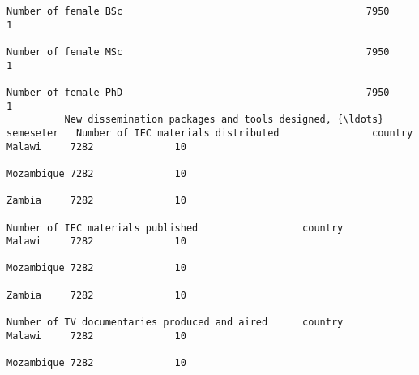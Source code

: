 \documentclass[11pt]{article}
\begin{document}
\begin{Verbatim}[commandchars=\\\{\}]
                                                                                                                                                              Number of female BSc                                          7950               1  
                                                                                                                                                              Number of female MSc                                          7950               1  
                                                                                                                                                              Number of female PhD                                          7950               1  
          New dissemination packages and tools designed, {\ldots} semeseter   Number of IEC materials distributed                country                                                                              Malawi     7282              10  
                                                                                                                                                                                                                 Mozambique 7282              10  
                                                                                                                                                                                                                 Zambia     7282              10  
                                                                         Number of IEC materials published                  country                                                                              Malawi     7282              10  
                                                                                                                                                                                                                 Mozambique 7282              10  
                                                                                                                                                                                                                 Zambia     7282              10  
                                                                         Number of TV documentaries produced and aired      country                                                                              Malawi     7282              10  
                                                                                                                                                                                                                 Mozambique 7282              10  

\end{Verbatim}
\end{document}
